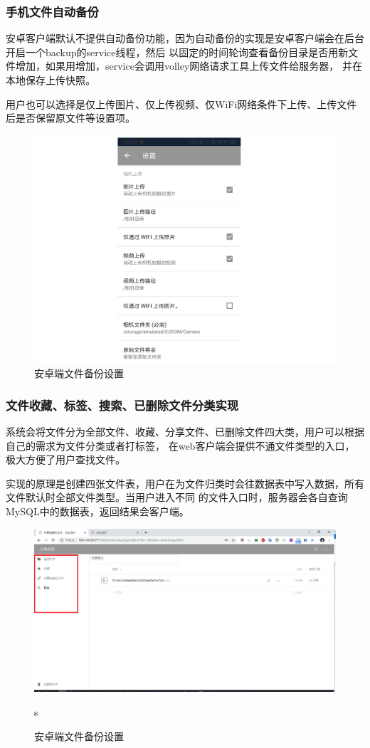 \subsubsection{手机文件自动备份}
安卓客户端默认不提供自动备份功能，因为自动备份的实现是安卓客户端会在后台开启一个backup的service线程，然后
以固定的时间轮询查看备份目录是否用新文件增加，如果用增加，service会调用volley网络请求工具上传文件给服务器，
并在本地保存上传快照。

用户也可以选择是仅上传图片、仅上传视频、仅WiFi网络条件下上传、上传文件后是否保留原文件等设置项。
\begin{figure}[H]
    \centering
    \includegraphics[width=130mm]{./figures/android_file_bck.png}
    \caption{安卓端文件备份设置}
    \label{android_videos}
  \end{figure}

\subsubsection{文件收藏、标签、搜索、已删除文件分类实现}
系统会将文件分为全部文件、收藏、分享文件、已删除文件四大类，用户可以根据自己的需求为文件分类或者打标签，
在web客户端会提供不通文件类型的入口，极大方便了用户查找文件。

实现的原理是创建四张文件表，用户在为文件归类时会往数据表中写入数据，所有文件默认时全部文件类型。当用户进入不同
的文件入口时，服务器会各自查询MySQL中的数据表，返回结果会客户端。
\begin{figure}[H]
    \centering
    \includegraphics[width=130mm]{./figures/web_file_attach.png}
    \caption{安卓端文件备份设置}
    \label{android_videos}s
  \end{figure}

